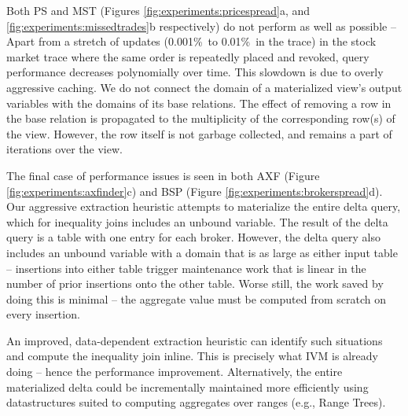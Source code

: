 Both PS and MST (Figures \ref{fig:experiments:pricespread}a, and \ref{fig:experiments:missedtrades}b respectively) do not perform as well as possible -- Apart from a stretch of updates (0.001\%\ to 0.01\%\ in the trace) in the stock market trace where the same order is repeatedly placed and revoked, query performance decreases polynomially over time.  This slowdown is due to overly aggressive caching.  We do not connect the domain of a materialized view's output variables with the domains of its base relations.  The effect of removing a row in the base relation is propagated to the multiplicity of the corresponding row(s) of the view.  However, the row itself is not garbage collected, and remains a part of iterations over the view.

The final case of performance issues is seen in both AXF (Figure \ref{fig:experiments:axfinder}c) and BSP (Figure \ref{fig:experiments:brokerspread}d).  Our aggressive extraction heuristic attempts to materialize the entire delta query, which for inequality joins includes an unbound variable.  The result of the delta query is a table with one entry for each broker.  However, the delta query also includes an unbound variable with a domain that is as large as either input table -- insertions into either table trigger maintenance work that is linear in the number of prior insertions onto the other table.  Worse still, the work saved by doing this is minimal -- the aggregate value must be computed from scratch on every insertion.

An improved, data-dependent extraction heuristic can identify such situations and compute the inequality join inline.  This is precisely what IVM is already doing -- hence the performance improvement.  Alternatively, the entire materialized delta could be incrementally maintained more efficiently using datastructures suited to computing aggregates over ranges (e.g., Range Trees\cite{rangequeries}).


